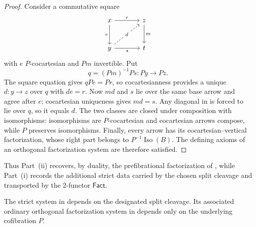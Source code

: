 \documentclass[11pt]{article}
\theoremstyle{plain}
\theoremstyle{definition}
\theoremstyle{remark}
\newcommand{\Iso}{\operatorname{Iso}}
\newcommand{\Fact}{\mathsf{Fact}}
\numberwithin{equation}{section}
\begin{document}
\begin{proof}
Consider a commutative square
\begin{equation}
\begin{tikzcd}[column sep=large,row sep=large]
x \arrow[r,"r"] \arrow[d,"e"']
  & z \arrow[d,"m"] \\
y \arrow[r,"s"'] \arrow[ur,dashed,"d" description]
  & t
\end{tikzcd}
\label{eq:orth-square}
\end{equation}
with $e$ $P$-cocartesian and $Pm$ invertible.  Put
\begin{equation*}
q=(Pm)^{-1}Ps\colon Py\longrightarrow Pz.
\end{equation*}
The square equation gives $qPe=Pr$, so cocartesianness provides a
unique $d\colon y\to z$ over $q$ with $de=r$.  Now $md$ and $s$ lie
over the same base arrow and agree after $e$; cocartesian uniqueness
gives $md=s$.  Any diagonal in  is forced to lie
over $q$, so it equals $d$.  The two classes are closed under
composition with isomorphisms: isomorphisms are $P$-cocartesian and
cocartesian arrows compose, while $P$ preserves isomorphisms.  Finally,
every arrow has its cocartesian--vertical factorization, whose right
part belongs to $P^{-1}\Iso(B)$.  The defining axioms of an orthogonal
factorization system are therefore satisfied.
\end{proof}

Thus Part~\textup{(ii)} recovers, by duality, the prefibrational
factorization of \citet[Section~3.7]{RosickyTholen2007}, while
Part~\textup{(i)}
records the additional strict data carried by the chosen split
cleavage and transported by the 2-functor $\Fact$.

The strict system in  depends on the designated
split cleavage.  Its associated ordinary orthogonal factorization
system in  depends only on the underlying
cofibration $P$.
\end{document}
